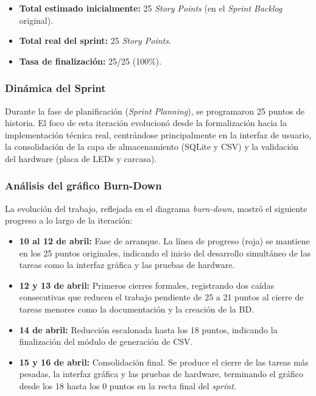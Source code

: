 \begin{itemize}
    \item \textbf{Total estimado inicialmente:} 25 \textit{Story Points} (en el \textit{Sprint Backlog} original).
    \item \textbf{Total real del sprint:} 25 \textit{Story Points}.
    \item \textbf{Tasa de finalización:} 25/25 (100\%).
\end{itemize}

\subsubsection{Dinámica del Sprint}
Durante la fase de planificación (\textit{Sprint Planning}), se programaron 25 puntos de historia. El foco de esta iteración evolucionó desde la formalización hacia la implementación técnica real, centrándose principalmente en la interfaz de usuario, la consolidación de la capa de almacenamiento (SQLite y CSV) y la validación del hardware (placa de LEDs y carcasa).

\subsubsection{Análisis del gráfico Burn-Down}

La evolución del trabajo, reflejada en el diagrama \textit{burn-down}, mostró el siguiente progreso a lo largo de la iteración:

\begin{itemize}
    \item \textbf{10 al 12 de abril:} Fase de arranque. La línea de progreso (roja) se mantiene en los 25 puntos originales, indicando el inicio del desarrollo simultáneo de las tareas como la interfaz gráfica y las pruebas de hardware.
    \item \textbf{12 y 13 de abril:} Primeros cierres formales, registrando dos caídas consecutivas que reducen el trabajo pendiente de 25 a 21 puntos al cierre de tareas menores como la documentación y la creación de la BD.
    \item \textbf{14 de abril:} Reducción escalonada hasta los 18 puntos, indicando la finalización del módulo de generación de CSV.
    \item \textbf{15 y 16 de abril:} Consolidación final. Se produce el cierre de las tareas más pesadas, la interfaz gráfica y las pruebas de hardware, terminando el gráfico desde los 18 hasta los 0 puntos en la recta final del \textit{sprint}.
\end{itemize}

